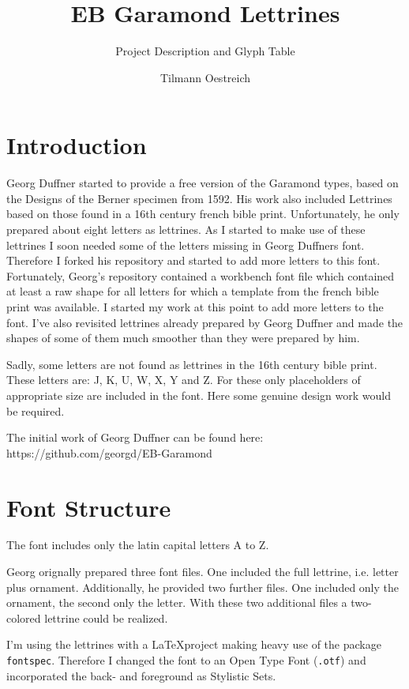 \documentclass[fontsize=12pt, parskip=full]{scrartcl}
\begin{document}
    \title{EB Garamond Lettrines}
    \subtitle{Project Description and Glyph Table}
    \author{Tilmann Oestreich}
    \maketitle

    \section*{Introduction}

    Georg Duffner started to provide a free version of the Garamond types, based on the Designs of the Berner specimen from 1592. His work also included Lettrines based on those found in a 16th century french bible print. Unfortunately, he only prepared about eight letters as lettrines. As I started to make use of these lettrines I soon needed some of the letters missing in Georg Duffners font. Therefore I forked his repository and started to add more letters to this font. Fortunately, Georg's repository contained a workbench font file which contained at least a raw shape for all letters for which a template from the french bible print was available. I started my work at this point to add more letters to the font. I've also revisited lettrines already prepared by Georg Duffner and made the shapes of some of them much smoother than they were prepared by him.

    Sadly, some letters are not found as lettrines in the 16th century bible print. These letters are: J, K, U, W, X, Y and Z. For these only placeholders of appropriate size are included in the font. Here some genuine design work would be required.

    The initial work of Georg Duffner can be found here: https://github.com/georgd/EB-Garamond

    \section*{Font Structure}

    The font includes only the latin capital letters A to Z.

    Georg orignally prepared three font files. One included the full lettrine, i.e. letter plus ornament. Additionally, he provided two further files. One included only the ornament, the second only the letter. With these two additional files a two-colored lettrine could be realized.

    I'm using the lettrines with a \LaTeX project making heavy use of the package \texttt{fontspec}. Therefore I changed the font to an Open Type Font (\texttt{.otf}) and incorporated the back- and foreground as Stylistic Sets.
\end{document}
